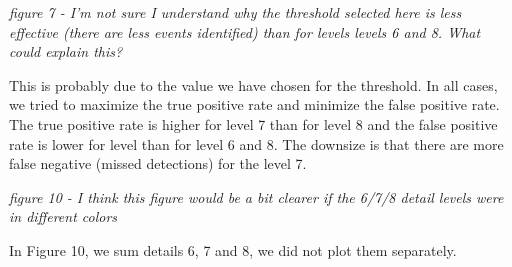 \documentclass[letterpaper, 12pt]{article}
\begin{document}
\textit{figure 7 - I'm not sure I understand why the threshold selected here is less effective (there are less events identified) than for levels levels 6 and 8. What could explain this?}

\bigskip

This is probably due to the value we have chosen for the threshold. In all cases, we tried to maximize the true positive rate and minimize the false positive rate. The true positive rate is higher for level 7 than for level 8 and the false positive rate is lower for level than for level 6 and 8. The downsize is that there are more false negative (missed detections) for the level 7.

\bigskip

\textit{figure 10 - I think this figure would be a bit clearer if the 6/7/8 detail levels were in different colors}

\bigskip

In Figure 10, we sum details 6, 7 and 8, we did not plot them separately.
\end{document}
